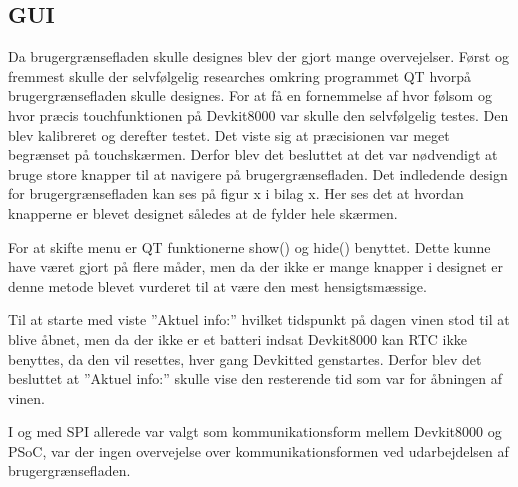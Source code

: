 \subsection{GUI}

Da brugergrænsefladen skulle designes blev der gjort mange overvejelser. Først og fremmest skulle der selvfølgelig researches omkring programmet QT hvorpå brugergrænsefladen skulle designes. For at få en fornemmelse af hvor følsom og hvor præcis touchfunktionen på Devkit8000 var skulle den selvfølgelig testes. Den blev kalibreret og derefter testet. Det viste sig at præcisionen var meget begrænset på touchskærmen. Derfor blev det besluttet at det var nødvendigt at bruge store knapper til at navigere på brugergrænsefladen. Det indledende design for brugergrænsefladen kan ses på figur x i bilag x. Her ses det at hvordan knapperne er blevet designet således at de fylder hele skærmen.

For at skifte menu er QT funktionerne show() og hide() benyttet. Dette kunne have været gjort på flere måder, men da der ikke er mange knapper i designet er denne metode blevet vurderet til at være den mest hensigtsmæssige.

Til at starte med viste ”Aktuel info:” hvilket tidspunkt på dagen vinen stod til at blive åbnet, men da der ikke er et batteri indsat Devkit8000 kan RTC ikke benyttes, da den vil resettes, hver gang Devkitted genstartes. Derfor blev det besluttet at ”Aktuel info:” skulle vise den resterende tid som var for åbningen af vinen.
 
I og med SPI allerede var valgt som kommunikationsform mellem Devkit8000 og PSoC, var der ingen overvejelse over kommunikationsformen ved udarbejdelsen af brugergrænsefladen. 
